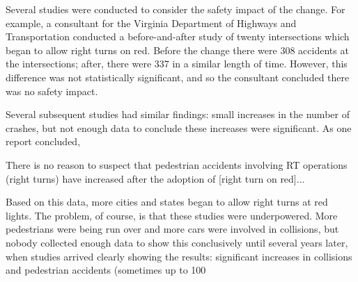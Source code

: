 Several studies were conducted to consider the safety impact of the change. For example, a consultant for the Virginia Department of Highways and Transportation conducted a before-and-after study of twenty intersections which began to allow right turns on red. Before the change there were 308 accidents at the intersections; after, there were 337 in a similar length of time. However, this difference was not statistically significant, and so the consultant concluded there was no safety impact.

Several subsequent studies had similar findings: small increases in the number of crashes, but not enough data to conclude these increases were significant. As one report concluded,

    There is no reason to suspect that pedestrian accidents involving RT operations (right turns) have increased after the adoption of [right turn on red]...

Based on this data, more cities and states began to allow right turns at red lights. The problem, of course, is that these studies were underpowered. More pedestrians were being run over and more cars were involved in collisions, but nobody collected enough data to show this conclusively until several years later, when studies arrived clearly showing the results: significant increases in collisions and pedestrian accidents (sometimes up to 100%

